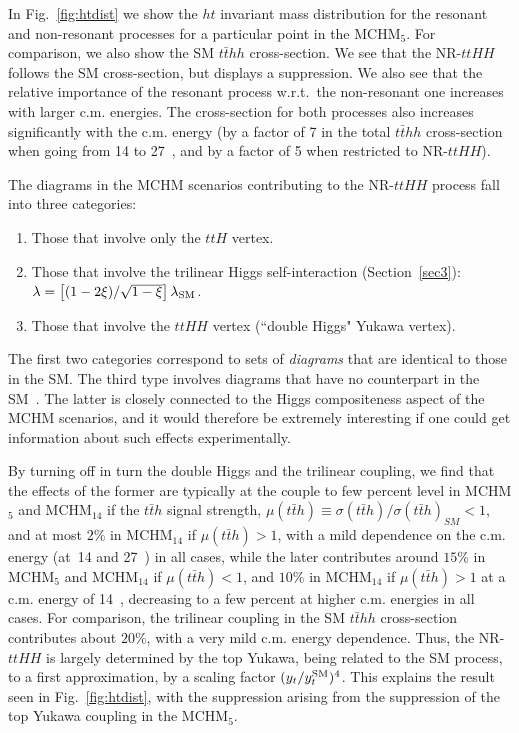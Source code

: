 In Fig.~\ref{fig:htdist} we show the $ht$ invariant mass distribution
for the resonant and non-resonant processes for a particular point in
the MCHM$_5$.  For comparison, we also show the SM $t\bar{t}hh$
cross-section.  We see that the NR-$ttHH$ follows the SM cross-section,
but displays a suppression.  We also see that the relative importance
of the resonant process w.r.t.~the non-resonant one increases with
larger c.m. energies.  The cross-section for both processes also
increases significantly with the c.m. energy (by a factor of 7 in the
total $t\bar{t}hh$ cross-section when going from 14 to 27~\UTeV, and by
a factor of 5 when restricted to NR-$ttHH$). 

\label{NRtth}
The diagrams in the MCHM scenarios contributing to the NR-$ttHH$ process
fall into three categories:
%
\begin{enumerate}
\item Those that involve only the $ttH$ vertex.
\item Those that involve the trilinear Higgs self-interaction (Section~\ref{sec3}):
$\lambda = \left[ (1 - 2 \xi)/\sqrt{1 - \xi} \right] \lambda_{\rm
SM}$.
\item Those that involve the $ttHH$ vertex (``double Higgs" Yukawa vertex).
\end{enumerate}
%
The first two categories correspond to sets of \textit{diagrams} that
are identical to those in the SM. The third type involves diagrams
that have no counterpart in the SM~\cite{Contino:2012xk}.  The latter
is closely connected to the Higgs compositeness aspect of the MCHM
scenarios, and it would therefore be extremely interesting if one
could get information about such effects experimentally.

By turning off in turn the double Higgs and the trilinear coupling, we find that the effects of the former are
typically at the couple to few percent level in MCHM$_5$ and MCHM$_{14}$ if the $t\bar{t}h$ signal strength,
$\mu(t\bar{t}h) \equiv \sigma(t\bar{t}h)/{\sigma(t\bar{t}h)}_{SM} < 1$, 
and at most $2\%$ in MCHM$_{14}$ if $\mu(t\bar{t}h) > 1$, with a mild dependence
on the c.m. energy (at~14 and 27~\UTeV) in all cases, while the later contributes around $15\%$ in MCHM$_5$ and MCHM$_{14}$ if $\mu(t\bar{t}h) < 1$, and $10\%$ in MCHM$_{14}$ if $\mu(t\bar{t}h) > 1$ at a c.m. energy of 14~\UTeV, decreasing to a few
percent at higher c.m. energies in all cases.  For comparison, the trilinear coupling in the SM $t\bar{t}hh$ cross-section
contributes about $20\%$, with a very mild c.m. energy dependence.  Thus, the NR-$ttHH$ is largely determined
by the top Yukawa, being related to the SM process, to a first approximation, by a scaling factor $(y_t / y_t^ {\rm SM})^4$.
This explains the result seen in Fig.~\ref{fig:htdist}, with the
suppression arising from the suppression of the top Yukawa coupling in
the MCHM$_5$.

